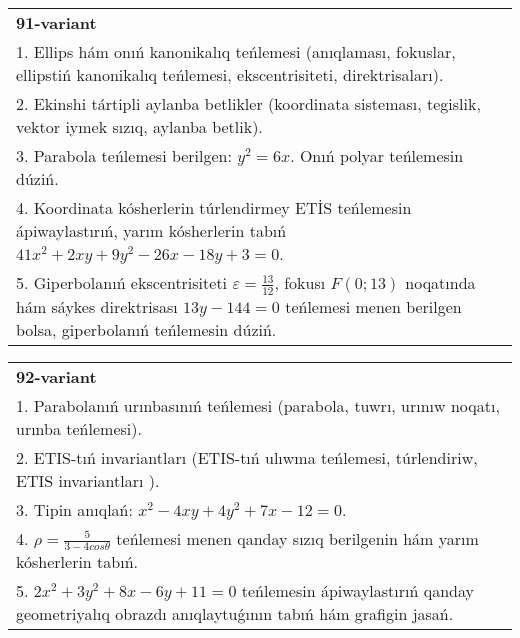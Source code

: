 \documentclass{article}
\begin{document}
\begin{tabular}{m{17cm}}
\textbf{91-variant}\\
1. Ellips hám onıń kanonikalıq teńlemesi (anıqlaması, fokuslar, ellipstiń kanonikalıq teńlemesi, ekscentrisiteti, direktrisaları).\\

2. Ekinshi tártipli aylanba betlikler (koordinata sisteması, tegislik, vektor iymek sızıq, aylanba betlik).\\

3. Parabola teńlemesi berilgen: $y^2=6 x$. Onıń polyar teńlemesin dúziń.\\

4. Koordinata kósherlerin túrlendirmey ETİS teńlemesin ápiwaylastırıń, yarım kósherlerin tabıń $41x^{2} + 2xy + 9y^{2} - 26x - 18y + 3 = 0$.  \\

5. Giperbolanıń ekscentrisiteti $\varepsilon = \frac{13}{12}$, fokusı $F(0;13)$ noqatında hám sáykes direktrisası $13y - 144 = 0$ teńlemesi menen berilgen bolsa, giperbolanıń teńlemesin dúziń.  
\end{tabular}
\vspace{1cm}


\begin{tabular}{m{17cm}}
\textbf{92-variant}\\
1. Parabolanıń urınbasınıń teńlemesi (parabola, tuwrı, urınıw noqatı, urınba teńlemesi).\\

2. ETIS-tıń invariantları (ETIS-tıń ulıwma teńlemesi, túrlendiriw, ETIS invariantları ).\\

3. Tipin anıqlań: $x^{2}-4 xy+4 y^{2}+7 x-12=0$.\\

4. $\rho = \frac{5}{3 - 4cos\theta}$ teńlemesi menen qanday sızıq berilgenin hám yarım kósherlerin tabıń.  \\

5. $2x^{2} + 3y^{2} + 8x - 6y + 11 = 0$ teńlemesin ápiwaylastırıń qanday geometriyalıq obrazdı anıqlaytuǵının tabıń hám grafigin jasań.  
\end{tabular}
\vspace{1cm}
\end{document}

